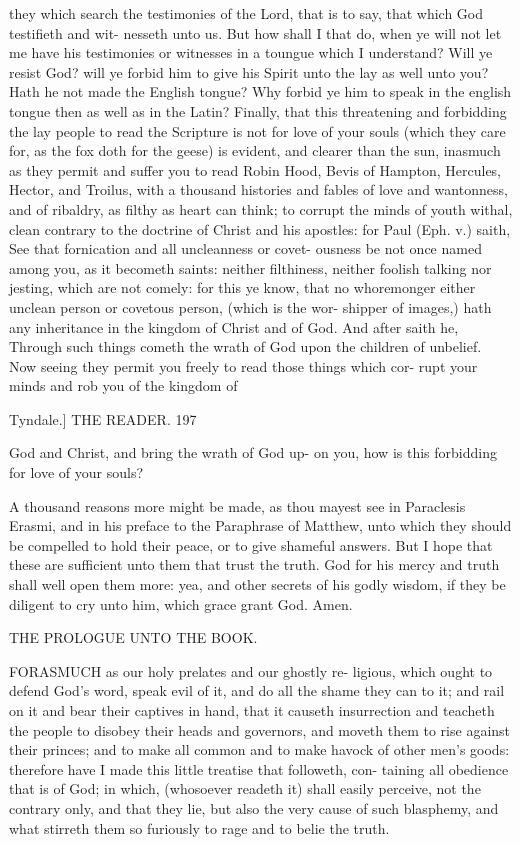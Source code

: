 \documentclass{custom}
\begin{document}
they which search the testimonies of the Lord, 
that is to say, that which God testifieth and wit- 
nesseth unto us. But how shall I that do, when ye 
will not let me have his testimonies or witnesses 
in a toungue which I understand? Will ye resist 
God? will ye forbid him to give his Spirit unto 
the lay as well unto you? Hath he not made the 
English tongue? Why forbid ye him to speak in 
the english tongue then as well as in the Latin?
Finally, that this threatening and forbidding the 
lay people to read the Scripture is not for love of 
your souls (which they care for, as the fox doth 
for the geese) is evident, and clearer than the 
sun, inasmuch as they permit and suffer you to read 
Robin Hood, Bevis of Hampton, Hercules, Hector, 
and Troilus, with a thousand histories and fables of 
love and wantonness, and of ribaldry, as filthy as 
heart can think; to corrupt the minds of youth 
withal, clean contrary to the doctrine of Christ 
and his apostles: for Paul (Eph. v.) saith, See 
that fornication and all uncleanness or covet- 
ousness be not once named among you, as it 
becometh saints: neither filthiness, neither foolish 
talking nor jesting, which are not comely: for 
this ye know, that no whoremonger either unclean 
person or covetous person, (which is the wor- 
shipper of images,) hath any inheritance in the 
kingdom of Christ and of God. And after saith 
he, Through such things cometh the wrath of God 
upon the children of unbelief. Now seeing they 
permit you freely to read those things which cor- 
rupt your minds and rob you of the kingdom of 


Tyndale.]
THE READER. 
197

God and Christ, and bring the wrath of God up- 
on you, how is this forbidding for love of your 
souls?

A thousand reasons more might be made, as 
thou mayest see in Paraclesis Erasmi, and in his 
preface to the Paraphrase of Matthew, unto 
which they should be compelled to hold their 
peace, or to give shameful answers. But I hope 
that these are sufficient unto them that trust the 
truth. God for his mercy and truth shall well open 
them more: yea, and other secrets of his godly 
wisdom, if they be diligent to cry unto him, 
which grace grant God. Amen. 


THE PROLOGUE 
UNTO THE BOOK. 

FORASMUCH as our holy prelates and our ghostly re- 
ligious, which ought to defend God's word, speak evil 
of it, and do all the shame they can to it; and rail on it and 
bear their captives in hand, that it causeth insurrection and 
teacheth the people to disobey their heads and governors, 
and moveth them to rise against their princes; and to make 
all common and to make havock of other men's goods:
therefore have I made this little treatise that followeth, con- 
taining all obedience that is of God; in which, (whosoever 
readeth it) shall easily perceive, not the contrary only, and 
that they lie, but also the very cause of such blasphemy, 
and what stirreth them so furiously to rage and to belie the 
truth. 
\end{document}
